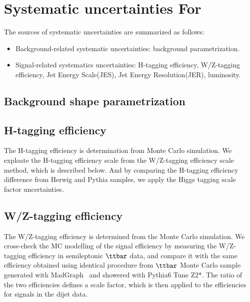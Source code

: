 \section{Systematic uncertainties For \HwwZqq\ }
\label{sec:systematics}

The sources of systematic uncertainties are summarized as
follows:
\begin{itemize}
\item Background-related systematic uncertainties: background parametrization.
\item Signal-related systematics uncertainties: H-tagging efficiency, W/Z-tagging efficiency, Jet Energy Scale(JES), Jet Energy Resolution(JER), luminosity.
\end{itemize}


\subsection{Background shape parametrization}
\label{sec:background}


\subsection{H-tagging efficiency}

The H-tagging efficiency is determination from Monte Carlo simulation. 
We exploate the H-tagging efficiency scale from the W/Z-tagging efficiency scale method, which is described below. 
And by comparing the H-tagging efficiency difference from Herwig and Pythia samples, we apply the 
Higgs tagging scale factor uncertainties. 




\subsection{W/Z-tagging efficiency}
\label{sec:vtageff}

The W/Z-tagging efficiency is determined from the Monte Carlo simulation.
We cross-check the MC modelling of the signal efficiency by measuring the W/Z-tagging efficiency
in semileptonic $\ttbar$ data, and compare it
with the same efficiency obtained using identical procedure from $\ttbar$ Monte Carlo sample generated with MadGraph~\cite{madgraph} and showered with Pythia6 Tune Z2*.
The ratio of the two efficiencies defines a scale factor, which is then applied to
the efficiencies for signals in the dijet data.

